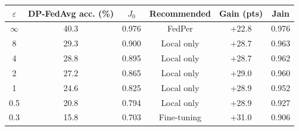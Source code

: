 \begin{tabular}{cccccc}
\toprule
$\varepsilon$ & DP-FedAvg acc. (\%) & $J_0$ & Recommended & Gain (pts) & Jain \\
\midrule
$\infty$ & 40.3 & 0.976 & FedPer & +22.8 & 0.976 \\
8 & 29.3 & 0.900 & Local only & +28.7 & 0.963 \\
4 & 28.8 & 0.895 & Local only & +28.7 & 0.962 \\
2 & 27.2 & 0.865 & Local only & +29.0 & 0.960 \\
1 & 24.6 & 0.825 & Local only & +28.9 & 0.952 \\
0.5 & 20.8 & 0.794 & Local only & +28.9 & 0.927 \\
0.3 & 15.8 & 0.703 & Fine-tuning & +31.0 & 0.906 \\
\bottomrule
\end{tabular}
